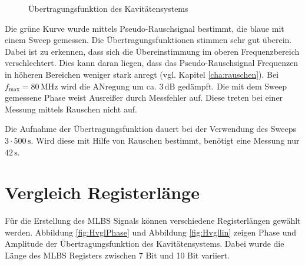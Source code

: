 \documentclass[12pt,report,final,twoside,accentcolor=tud9b,bigchapter]{tudreport}
\begin{document}
\begin{figure}
\begin{minipage}[t]{0.48\linewidth}
	\caption{Übertragungsfunktion des Kavitätensystems}
	\label{fig:HKavlin}
	
\end{minipage}
\end{figure}
Die grüne Kurve wurde mittels Pseudo-Rauschsignal bestimmt, die blaue mit einem Sweep gemessen. Die Übertragungsfunktionen stimmen sehr gut überein. Dabei ist zu erkennen, dass sich die Übereinstimmung im oberen Frequenzbereich verschlechtert. Dies kann daran liegen, dass das Pseudo-Rauschsignal Frequenzen in höheren Bereichen weniger stark anregt (vgl. Kapitel \ref{cha:rauschen}). Bei $f_{\mathrm{max}}=80\,\mathrm{MHz}$ wird die ANregung um ca. $3\,\mathrm{dB}$ gedämpft.
Die mit dem Sweep gemessene Phase weist Ausreißer durch Messfehler auf. Diese treten bei einer Messung mittels Rauschen nicht auf.

Die Aufnahme der Übertragungsfunktion dauert bei der Verwendung des Sweeps $3 \cdot 500\,\mathrm{s}$. Wird diese mit Hilfe von Rauschen bestimmt, benötigt eine Messung nur $42\,\mathrm{s}$. 
 

\section{Vergleich Registerlänge}

Für die Erstellung des MLBS Signals können verschiedene Registerlängen gewählt werden. Abbildung \ref{fig:HvglPhase} und Abbildung \ref{fig:Hvgllin} zeigen Phase und Amplitude der Übertragungsfunktion des Kavitätensystems. Dabei wurde die Länge des MLBS Registers zwischen 7 Bit und 10 Bit variiert.
\end{document}
